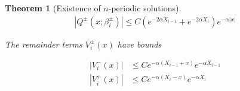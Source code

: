 \documentclass[12pt]{article}
\newtheorem{theorem}{Theorem}
\begin{document}
\begin{theorem}[Existence of $n$-periodic solutions]
\begin{align*}
|Q^\pm(x; \beta_i^\pm)| \leq C (e^{-2 \alpha X_{i-1}} + e^{-2 \alpha X_i})e^{-\alpha |x|}
\end{align*} 

The remainder terms $V_i^\pm(x)$ have bounds

\begin{align}
|V_i^-(x)| &\leq C e^{-\alpha(X_{i-1} + x)}e^{-\alpha X_{i-1}} \\
|V_i^+(x)| &\leq C e^{-\alpha(X_i - x)}e^{-\alpha X_i} 
\end{align} 

\end{theorem}
\end{document}
